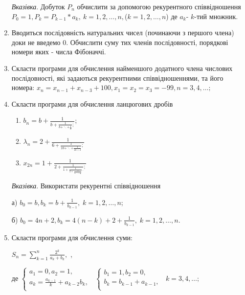 \documentclass[]{article}
\makeatletter
\newcommand{\xslalph}[1]{\expandafter\@xslalph\csname c@#1\endcsname}
\newcommand{\@xslalph}[1]{%
    \ifcase#1\or а\or б\or в\or г\or д\or e\or є\or ж\or з\or i%
    \or й\or к\or л\or м\or н\or о\or п\or р\or с\or т%
    \or у\or ф\or х\or ц\or ч\or ш\or ю\or я\or аа\or бб\or вв %
    \else\@ctrerr\fi%
}
\makeatother
\begin{document}
\begin{enumerate}
\emph{\emph{Вказівка}}. Добуток $P_{n}$ обчислити за
допомогою рекурентного співвідношення
\(P_{0} = 1,P_{k} = P_{k - 1}*a_{k},\ k = 1,2,\ldots,n,\)($k=1,2,\ldots,n$)
де \(a_{k}\)- $k$-тий множник.

\item
Вводиться послідовність натуральних чисел (починаючи з першого члена)
доки не введемо 0. Обчислити суму тих членів послідовності, порядкові
номери яких - числа Фібоначчі.

\item
  Скласти програми для обчислення найменшого додатного члена числових
  послідовності, які задаються рекурентними співвідношеннями, та його
  номера:
\(x_{n} = x_{n - 1} + x_{n - 3} + 100, x_{1} = x_{2} = x_{3} = - 99, n = 3,4,\ldots;\)

\item
  Скласти програми для обчислення ланцюгових дробів
\begin{enumerate}[label=\xslalph*)]
\item \(b_{n} = b + \frac{1}{b + \frac{1}{b + \ddots + \frac{1}{b}};}\); 
\item
\(\lambda_{n} = 2 + \frac{1}{6 + \frac{1}{10 + \ddots + \frac{1}{4n + 2}};}\)
\item
\(x_{2n} = 1 + \frac{1}{2 + \frac{1}{1 + \frac{1}{2 + \frac{1}{1 + \ddots + \frac{1}{2}}}.};}\)
\end{enumerate}
\emph{\emph{Вказівка}}. Використати рекурентні співвідношення

а)
\(b_{0} = b,b_{k} = b + \frac{1}{b_{k - 1}}, \; k = 1,2,\ldots,n\);

б)
\(b_{0} = 4n + 2,b_{k} = 4(n - k) + 2 + \frac{1}{b_{k - 1}},\; k = 1,2,\ldots,n\).

\item
  Скласти програми для обчислення суми:


\(S_{n} = \sum\limits_{k = 1}^{n}\frac{2^{k}}{a_{k} + b_{k}},\) ,

де \(\left\{ \begin{matrix}
 a_{1} = 0,a_{2} = 1, \\
 a_{k} = \frac{a_{k - 1}}{k} + a_{k - 2}b_{k}, \\
\end{matrix} \right.\ \) \(\left\{ \begin{matrix}
 b_{1} = 1,b_{2} = 0, \\
 b_{k} = b_{k - 1} + a_{k - 1}, \\
\end{matrix} \right.\ \) \(k = 3,4,\ldots;\)



\end{enumerate}
\end{document}
